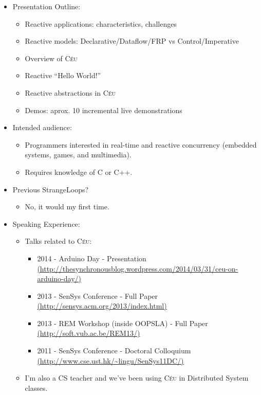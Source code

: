 \documentclass[11pt,a4paper]{article}
\newcommand{\CEU}{\textsc{C\'{e}u}\xspace}
\begin{document}
\begin{itemize}
    \item Presentation Outline:
        \begin{itemize}
        \item Reactive applications: characteristics, challenges
        \item Reactive models: Declarative/Dataflow/FRP vs Control/Imperative
        \item Overview of \CEU
        \item Reactive ``Hello World!''
        \item Reactive abstractions in \CEU
        \item Demos: aprox. 10 incremental live demonstrations
        \end{itemize}

    \item Intended audience:
        \begin{itemize}
        \item Programmers interested in real-time and reactive concurrency 
      (embedded systems, games, and multimedia).
        \item Requires knowledge  of C or C++.
        \end{itemize}

    \item Previous StrangeLoops?
        \begin{itemize}
        \item No, it would my first time.
        \end{itemize}

    \item Speaking Experience:
        \begin{itemize}
        \item Talks related to \CEU:
            \begin{itemize}
            \item 2014 - Arduino Day - Presentation
               \url{(http://thesynchronousblog.wordpress.com/2014/03/31/ceu-on-arduino-day/)}
            \item 2013 - SenSys Conference - Full Paper
               \url{(http://sensys.acm.org/2013/index.html)}
            \item 2013 - REM Workshop (inside OOPSLA) - Full Paper
               \url{(http://soft.vub.ac.be/REM13/)}
            \item 2011 - SenSys Conference - Doctoral Colloquium
               \url{(http://www.cse.ust.hk/~lingu/SenSys11DC/)}
            \end{itemize}
        \item I'm also a CS teacher and we've been using \CEU in Distributed 
System classes.
        \end{itemize}


\end{itemize}
\end{document}
